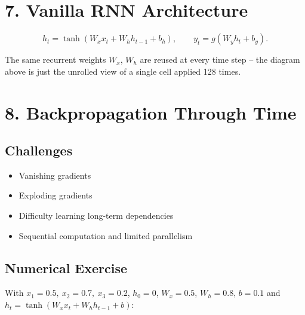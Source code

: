 \documentclass[10pt]{article}
\begin{document}
\section*{7. Vanilla RNN Architecture}

\[
h_t=\tanh(W_xx_t+W_hh_{t-1}+b_h),\qquad y_t=g(W_yh_t+b_y).
\]

\begin{center}
\end{center}

The same recurrent weights $W_x$, $W_h$ are reused at every time step -- the
diagram above is just the unrolled view of a single cell applied 128 times.

\section*{8. Backpropagation Through Time}

\subsection*{Challenges}

\begin{itemize}
\item Vanishing gradients
\item Exploding gradients
\item Difficulty learning long-term dependencies
\item Sequential computation and limited parallelism
\end{itemize}

\subsection*{Numerical Exercise}

With $x_1=0.5,\ x_2=0.7,\ x_3=0.2$, $h_0=0$, $W_x=0.5$, $W_h=0.8$, $b=0.1$ and
$h_t=\tanh(W_xx_t+W_hh_{t-1}+b)$:
\end{document}
